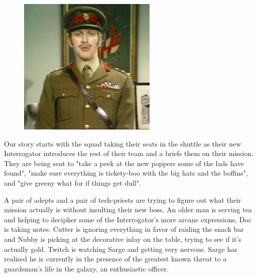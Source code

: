 \begin{figure}
	\begin{center}
		\includegraphics[width=\figwidth]{pics/4/2.png}
	\end{center}
\end{figure}
Our story starts with the squad taking their seats in the shuttle as their new Interrogator introduces the rest of their team and a briefs them on their mission.
They are being sent to "take a peek at the new poppers some of the lads have found", "make sure everything is tickety-boo with the big hats and the boffins", and "give greeny what for if things get dull". 

A pair of adepts and a pair of tech-priests are trying to figure out what their mission actually is without insulting their new boss. 
An older man is serving tea and helping to decipher some of the Interrogator's more arcane expressions, Doc is taking notes. 
Cutter is ignoring everything in favor of raiding the snack bar and Nubby is picking at the decorative inlay on the table, trying to see if it's actually gold. 
Twitch is watching Sarge and getting very nervous. 
Sarge has realised he is currently in the presence of the greatest known threat to a guardsman's life in the galaxy, an enthusiastic officer.

